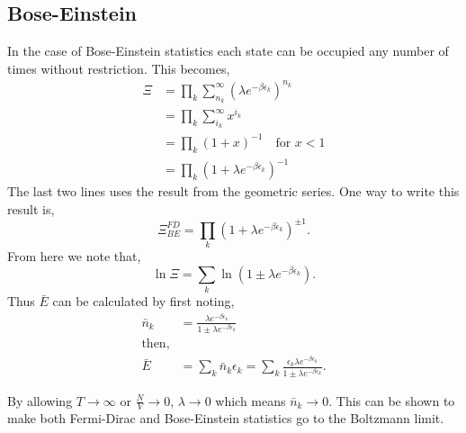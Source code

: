 \subsection{Bose-Einstein}
In the case of Bose-Einstein statistics each state can be occupied any number of
times without restriction. This becomes,
\begin{align*}
	\Xi &= \prod_k \sum_{n_k}^{\infty}{(\lambda e^{-\beta \epsilon_k})^{n_k}}\\
		&= \prod_k \sum_{i_k}^{\infty}{x^{i_k}}\\
		&= \prod_k (1 + x)^{-1} \quad \text{for } x < 1\\
		&= \prod_k (1 + \lambda e^{-\beta \epsilon_k})^{-1}
\end{align*}
The last two lines uses the result from the geometric series. One way to write
this result is,
\begin{equation*}
	\Xi_{BE}^{FD} = \prod_k{(1 + \lambda e^{-\beta \epsilon_k})^{\pm 1}}.
\end{equation*}
From here we note that,
\begin{equation*}
	\ln\Xi = \sum_k{\ln{(1 \pm \lambda e^{-\beta \epsilon_k})}}.
\end{equation*}
Thus $\bar{E}$ can be calculated by first noting,
\begin{align*}
	\bar{n}_k &= \frac{\lambda e^{-\beta \epsilon_k}}{1 \pm \lambda e^{-\beta
	\epsilon_k}}\\
	\text{then,}\\
	\bar{E} &= \sum_k{\bar{n}_k \epsilon_k} = \sum_k{\frac{\epsilon_k
		\lambda e^{-\beta \epsilon_k}}{1 \pm \lambda e^{-\beta
		\epsilon_k}}}.
\end{align*}

By allowing $T \to \infty$ or $\frac{N}{V} \to 0$, $\lambda \to 0$ which means
$\bar{n}_k \to 0$. This can be shown to make both Fermi-Dirac and Bose-Einstein
statistics go to the Boltzmann limit.
